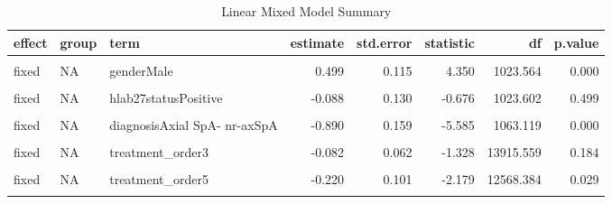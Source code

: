 \begin{table}[!h]
\centering
\caption{\label{tab:unnamed-chunk-95}Linear Mixed Model Summary}
\centering
\begin{tabular}[t]{lllrrrrr}
\toprule
effect & group & term & estimate & std.error & statistic & df & p.value\\
\midrule
\cellcolor{gray!10}{fixed} & \cellcolor{gray!10}{NA} & \cellcolor{gray!10}{(Intercept)} & \cellcolor{gray!10}{1.036} & \cellcolor{gray!10}{0.223} & \cellcolor{gray!10}{4.647} & \cellcolor{gray!10}{1107.592} & \cellcolor{gray!10}{0.000}\\
fixed & NA & genderMale & 0.499 & 0.115 & 4.350 & 1023.564 & 0.000\\
\cellcolor{gray!10}{fixed} & \cellcolor{gray!10}{NA} & \cellcolor{gray!10}{hlab27statusNegative} & \cellcolor{gray!10}{-0.031} & \cellcolor{gray!10}{0.187} & \cellcolor{gray!10}{-0.165} & \cellcolor{gray!10}{1036.826} & \cellcolor{gray!10}{0.869}\\
fixed & NA & hlab27statusPositive & -0.088 & 0.130 & -0.676 & 1023.602 & 0.499\\
\cellcolor{gray!10}{fixed} & \cellcolor{gray!10}{NA} & \cellcolor{gray!10}{age\_at\_basmi} & \cellcolor{gray!10}{0.049} & \cellcolor{gray!10}{0.004} & \cellcolor{gray!10}{11.986} & \cellcolor{gray!10}{1164.554} & \cellcolor{gray!10}{0.000}\\
\addlinespace
fixed & NA & diagnosisAxial SpA- nr-axSpA & -0.890 & 0.159 & -5.585 & 1063.119 & 0.000\\
\cellcolor{gray!10}{fixed} & \cellcolor{gray!10}{NA} & \cellcolor{gray!10}{treatment\_order2} & \cellcolor{gray!10}{-0.158} & \cellcolor{gray!10}{0.075} & \cellcolor{gray!10}{-2.099} & \cellcolor{gray!10}{14636.443} & \cellcolor{gray!10}{0.036}\\
fixed & NA & treatment\_order3 & -0.082 & 0.062 & -1.328 & 13915.559 & 0.184\\
\cellcolor{gray!10}{fixed} & \cellcolor{gray!10}{NA} & \cellcolor{gray!10}{treatment\_order4} & \cellcolor{gray!10}{-0.295} & \cellcolor{gray!10}{0.091} & \cellcolor{gray!10}{-3.255} & \cellcolor{gray!10}{14556.081} & \cellcolor{gray!10}{0.001}\\
fixed & NA & treatment\_order5 & -0.220 & 0.101 & -2.179 & 12568.384 & 0.029\\
\addlinespace
\cellcolor{gray!10}{fixed} & \cellcolor{gray!10}{NA} & \cellcolor{gray!10}{treatment\_order6} & \cellcolor{gray!10}{-0.333} & \cellcolor{gray!10}{0.135} & \cellcolor{gray!10}{-2.477} & \cellcolor{gray!10}{13543.852} & \cellcolor{gray!10}{0.013}\\

\end{tabular}
\end{table}

